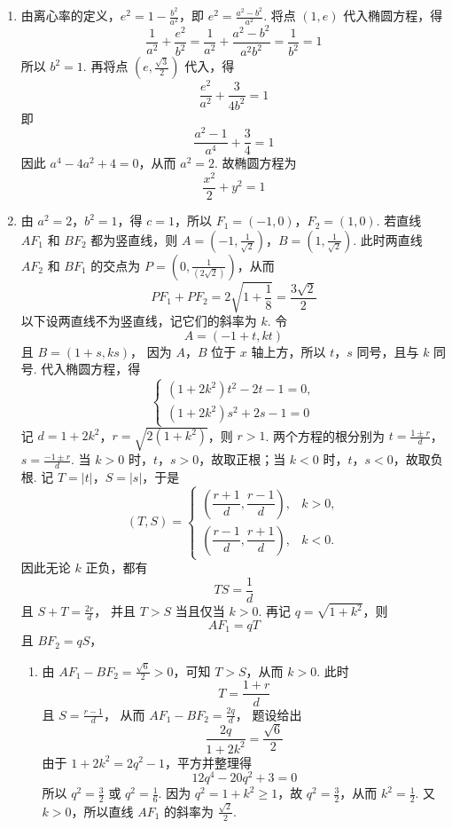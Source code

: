 \begin{solution}
\begin{enumerate}
\item 由离心率的定义，\(e^2=1-\frac{b^2}{a^2}\)，即 \(e^2=\frac{a^2-b^2}{a^2}\). 将点 \((1,e)\) 代入椭圆方程，得
\[
\frac{1}{a^2}+\frac{e^2}{b^2}=\frac{1}{a^2}+\frac{a^2-b^2}{a^2b^2}=\frac{1}{b^2}=1
\]
所以 \(b^2=1\). 再将点 \(\left(e,\frac{\sqrt{3}}{2}\right)\) 代入，得
\[
\frac{e^2}{a^2}+\frac{3}{4b^2}=1
\]
即
\[
\frac{a^2-1}{a^4}+\frac{3}{4}=1
\]
因此 \(a^4-4a^2+4=0\)，从而 \(a^2=2\). 故椭圆方程为
\[
\frac{x^2}{2}+y^2=1
\]

\item 由 \(a^2=2\)，\(b^2=1\)，得 \(c=1\)，所以 \(F_{1}=(-1,0)\)，\(F_{2}=(1,0)\). 若直线 \(AF_{1}\) 和 \(BF_{2}\) 都为竖直线，则 \(A=(-1,\frac{1}{\sqrt{2}})\)，\(B=(1,\frac{1}{\sqrt{2}})\). 此时两直线 \(AF_{2}\) 和 \(BF_{1}\) 的交点为 \(P=(0,\frac{1}{(2\sqrt{2})})\)，从而
\[
PF_{1}+PF_{2}=2\sqrt{1+\frac{1}{8}}=\frac{3\sqrt{2}}{2}
\]
以下设两直线不为竖直线，记它们的斜率为 \(k\). 令
\[
A=(-1+t,kt)
\]
且 \(B=(1+s,ks)\)，
因为 \(A\)，\(B\) 位于 \(x\) 轴上方，所以 \(t\)，\(s\) 同号，且与 \(k\) 同号. 代入椭圆方程，得
\[
\begin{cases}
(1+2k^2)t^2-2t-1=0,\\
(1+2k^2)s^2+2s-1=0
\end{cases}
\]
记 \(d=1+2k^2\)，\(r=\sqrt{2(1+k^2)}\)，则 \(r>1\). 两个方程的根分别为
\(t=\frac{1\pm r}{d}\)，\(s=\frac{-1\pm r}{d}\).
当 \(k>0\) 时，\(t\)，\(s>0\)，故取正根；当 \(k<0\) 时，\(t\)，\(s<0\)，故取负根. 记 \(T=|t|\)，\(S=|s|\)，于是
\[
(T,S)=
\begin{cases}
\left(\dfrac{r+1}{d},\dfrac{r-1}{d}\right),& k>0,\\
\left(\dfrac{r-1}{d},\dfrac{r+1}{d}\right),& k<0.
\end{cases}
\]
因此无论 \(k\) 正负，都有
\[
TS=\frac{1}{d}
\]
且 \(S+T=\frac{2r}{d}\)，
并且 \(T>S\) 当且仅当 \(k>0\). 再记 \(q=\sqrt{1+k^2}\)，则
\[
AF_{1}=qT
\]
且 \(BF_{2}=qS\)，

\begin{enumerate}
\item 由 \(AF_{1}-BF_{2}=\frac{\sqrt{6}}{2}>0\)，可知 \(T>S\)，从而 \(k>0\). 此时
\[
T=\frac{1+r}{d}
\]
且 \(S=\frac{r-1}{d}\)，
从而 \(AF_{1}-BF_{2}=\frac{2q}{d}\)，
题设给出
\[
\frac{2q}{1+2k^2}=\frac{\sqrt{6}}{2}
\]
由于 \(1+2k^2=2q^2-1\)，平方并整理得
\[
12q^4-20q^2+3=0
\]
所以 \(q^2=\frac{3}{2}\) 或 \(q^2=\frac{1}{6}\). 因为 \(q^2=1+k^2\geqslant1\)，故 \(q^2=\frac{3}{2}\)，从而 \(k^2=\frac{1}{2}\). 又 \(k>0\)，所以直线 \(AF_{1}\) 的斜率为 \(\frac{\sqrt{2}}{2}\).


\end{enumerate}
\end{enumerate}
\end{solution}
